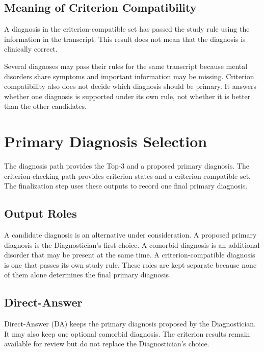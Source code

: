 \documentclass[12pt,a4paper,oneside]{report}
\begin{document}
\subsection{Meaning of Criterion Compatibility}
\label{sec:criterion-compatibility-boundary}

A diagnosis in the criterion-compatible set has passed the study rule
using the information in the transcript. This result does not mean that
the diagnosis is clinically correct.

Several diagnoses may pass their rules for the same transcript because
mental disorders share symptoms and important information may be
missing. Criterion compatibility also does not decide which diagnosis
should be primary. It answers whether one diagnosis is supported under
its own rule, not whether it is better than the other candidates.

\section{Primary Diagnosis Selection}
\label{sec:primary-selection}

The diagnosis path provides the Top-3 and a proposed primary diagnosis.
The criterion-checking path provides criterion states and a
criterion-compatible set. The finalization step uses these outputs to
record one final primary diagnosis.

\subsection{Output Roles}
\label{sec:diagnostic-output-roles}

A candidate diagnosis is an alternative under consideration. A proposed
primary diagnosis is the Diagnostician's first choice. A comorbid
diagnosis is an additional disorder that may be present at the same time.
A criterion-compatible diagnosis is one that passes its own study rule.
These roles are kept separate because none of them alone determines the
final primary diagnosis.

\subsection{Direct-Answer}
\label{sec:direct-answer-policy}

Direct-Answer (DA) keeps the primary diagnosis proposed by the
Diagnostician. It may also keep one optional comorbid diagnosis. The
criterion results remain available for review but do not replace the
Diagnostician's choice.
\end{document}
